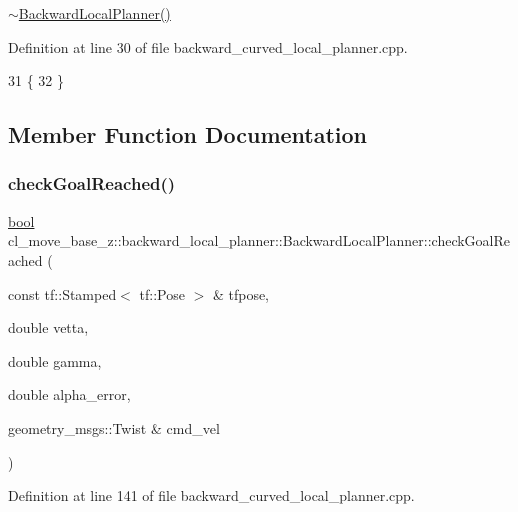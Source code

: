 \hyperlink{classcl__move__base__z_1_1backward__local__planner_1_1BackwardLocalPlanner_a6a36aa94617786c6958e861e64abb862}{$\sim$\+Backward\+Local\+Planner()} 

Definition at line 30 of file backward\+\_\+curved\+\_\+local\+\_\+planner.\+cpp.


\begin{DoxyCode}
31         \{
32         \}
\end{DoxyCode}


\subsection{Member Function Documentation}
\mbox{\label{classcl__move__base__z_1_1backward__local__planner_1_1BackwardLocalPlanner_a6c4363e82119a6a8a5a3bfe309280898}} 
\subsubsection{\texorpdfstring{check\+Goal\+Reached()}{checkGoalReached()}}
{\footnotesize\ttfamily \hyperlink{classbool}{bool} cl\+\_\+move\+\_\+base\+\_\+z\+::backward\+\_\+local\+\_\+planner\+::\+Backward\+Local\+Planner\+::check\+Goal\+Reached (\begin{DoxyParamCaption}\item[{const tf\+::\+Stamped$<$ tf\+::\+Pose $>$ \&}]{tfpose,  }\item[{double}]{vetta,  }\item[{double}]{gamma,  }\item[{double}]{alpha\+\_\+error,  }\item[{geometry\+\_\+msgs\+::\+Twist \&}]{cmd\+\_\+vel }\end{DoxyParamCaption})\hspace{0.3cm}{\ttfamily [private]}}



Definition at line 141 of file backward\+\_\+curved\+\_\+local\+\_\+planner.\+cpp.




